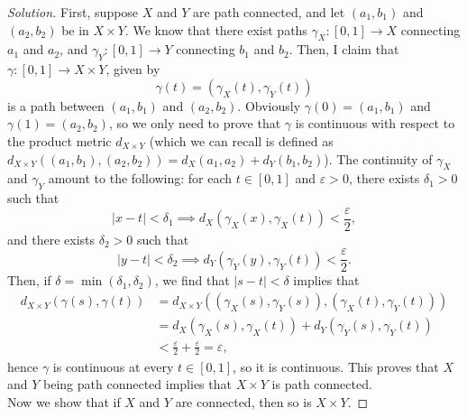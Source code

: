 \documentclass[11pt]{scrartcl}
\providecommand{\eps}{\varepsilon}
\newenvironment{soln}{\begin{proof}[Solution]}{\end{proof}}
\begin{document}
\begin{soln}
	First, suppose $X$ and $Y$ are path connected, and let
	$(a_1,b_1)$ and $(a_2, b_2)$ be in $X\times Y$.
	We know that there exist paths
	$\gamma_X\colon[0, 1]\to X$ connecting $a_1$ and $a_2$, and
	$\gamma_Y\colon[0,1]\to Y$ connecting $b_1$ and $b_2$.
	Then, I claim that $\gamma\colon[0, 1]\to X\times Y$,
	given by
	\[\gamma(t) = (\gamma_X(t), \gamma_Y(t))\]
	is a path between $(a_1,b_1)$ and $(a_2,b_2)$.
	Obviously $\gamma(0) = (a_1, b_1)$ and $\gamma(1) = (a_2, b_2)$,
	so we only need to prove that $\gamma$ is continuous
	with respect to the product metric $d_{X\times Y}$
	(which we can recall is defined as
	$d_{X\times Y}((a_1,b_1),(a_2,b_2)) = d_X(a_1, a_2) + d_Y(b_1, b_2)$).
	The continuity of $\gamma_X$ and $\gamma_Y$ amount to the following:
	for each $t\in[0,1]$ and $\eps>0$, there exists $\delta_1>0$ such that
	\[|x - t| < \delta_1\implies d_X(\gamma_X(x), \gamma_X(t)) < \frac\eps2,\]
	and there exists $\delta_2>0$ such that
	\[|y - t| < \delta_2\implies d_Y(\gamma_Y(y), \gamma_Y(t)) < \frac\eps2.\]
	Then, if $\delta = \min(\delta_1,\delta_2)$, we find that
	$|s - t| < \delta$ implies that
	\begin{align*}
		d_{X\times Y}(\gamma(s), \gamma(t)) &=
		d_{X\times Y}((\gamma_X(s), \gamma_Y(s)), (\gamma_X(t),\gamma_Y(t)))\\
		&= d_X(\gamma_X(s),\gamma_X(t)) + d_Y(\gamma_Y(s),\gamma_Y(t))\\
		&< \frac\eps2 + \frac\eps2 = \eps,
	\end{align*}
	hence $\gamma$ is continuous at every $t\in[0,1]$, so it is continuous.
	This proves that $X$ and $Y$ being path connected
	implies that $X\times Y$ is path connected.\\
	
	Now we show that if $X$ and $Y$ are connected, then so is $X\times Y$.


\end{soln}
\end{document}
